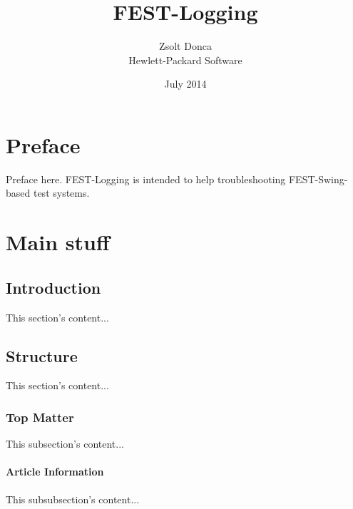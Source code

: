 \documentclass[11pt,twoside,a4paper,openright,draft]{book}
\begin{document}
\frontmatter

\title{FEST-Logging}
\author{Zsolt Donca\\ Hewlett-Packard Software}
\date{July 2014}

\maketitle



\chapter{Preface}
Preface here.
FEST-Logging is intended to help troubleshooting FEST-Swing-based test systems.

\mainmatter
\chapter {Main stuff}
\section{Introduction}
This section's content...

\section{Structure}
This section's content...

\subsection{Top Matter}
This subsection's content...

\subsubsection{Article Information}
This subsubsection's content...
\end{document}
